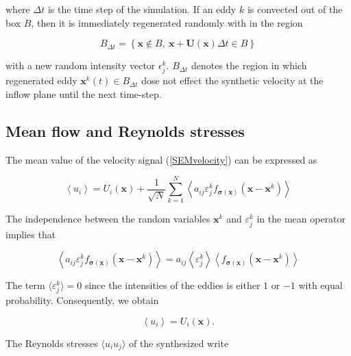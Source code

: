 \noindent where $\Delta t$ is the time step of the simulation. If an eddy $k$ is convected out of the box $B$, then it is immediately regenerated randomly with in the region

\begin{equation}
B_{\Delta t} = \left\{ \boldsymbol{x}\notin B, \ \boldsymbol{x}+\boldsymbol{U}(\boldsymbol{x})\Delta t \in B \right\}
\end{equation}

\noindent with a new random intensity vector $\epsilon_j^k$. $B_{\Delta t}$ denotes the region in which regenerated eddy $\boldsymbol{x}^k(t) \in B_{\Delta t}$ dose not effect the synthetic velocity at the inflow plane until the next time-step.

\subsection{Mean flow and Reynolds stresses}

\noindent The mean value of the velocity signal (\ref{SEMvelocity}) can be expressed as

\begin{equation}
\left\langle u_i \right\rangle = U_i(\boldsymbol{x}) + \frac{1}{\sqrt{N}}\sum_{k=1}^N \left\langle a_{ij} \varepsilon_j^k f_{\boldsymbol{\sigma}(\boldsymbol{x})}(\boldsymbol{x}-\boldsymbol{x}^k) \right\rangle
\end{equation}

\noindent The independence between the random variables $\boldsymbol{x}^k$ and $\varepsilon_j^k$ in the mean operator implies that

\begin{equation}
\left\langle a_{ij} \varepsilon_j^k f_{\boldsymbol{\sigma}(\boldsymbol{x})}(\boldsymbol{x}-\boldsymbol{x}^k) \right\rangle = a_{ij} \left\langle\varepsilon_j^k\right\rangle  \left\langle f_{\boldsymbol{\sigma}(\boldsymbol{x})}(\boldsymbol{x}-\boldsymbol{x}^k)  \right\rangle
\end{equation}

\noindent The term $\langle\varepsilon_j^k\rangle = 0$ since the intensities of the eddies is either $1$ or $-1$ with equal probability. Consequently, we obtain

\begin{equation}
\left\langle u_i \right\rangle = U_i(\boldsymbol{x}).
\end{equation}

\noindent The Reynolds stresses $\langle u_i u_j \rangle$ of the synthesized write

